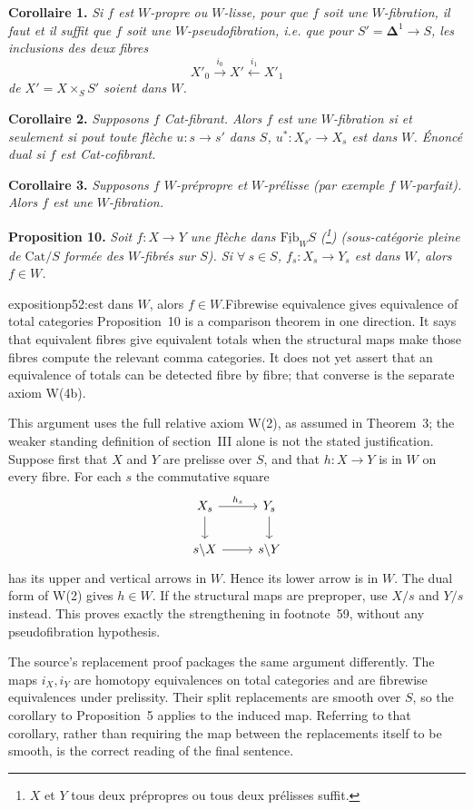 \textbf{Corollaire 1.} \textit{Si $f$ est $W$-propre ou $W$-lisse, pour que $f$ soit une $W$-fibration, il faut et il suffit que $f$ soit une $W$-pseudofibration, i.e. que pour $S' = \mathbf{\Delta}^1 \longrightarrow S$, les inclusions des deux fibres}
\[ X'_0 \xrightarrow{i_0} X' \xleftarrow{i_1} X'_1 \]
\textit{de $X' = X \times_S S'$ soient dans $W$.}

\textbf{Corollaire 2.} \textit{Supposons $f$ \textup{Cat}-fibrant. Alors $f$ est une $W$-fibration si et seulement si pout toute flèche $u : s \longrightarrow s'$ dans $S$, $u^* : X_{s'} \longrightarrow X_s$ est dans $W$. Énoncé dual si $f$ est \textup{Cat}-cofibrant.} %

\textbf{Corollaire 3.} \textit{Supposons $f$ $W$-prépropre et $W$-prélisse (par exemple $f$ $W$-parfait). Alors $f$ est une $W$-fibration.}

\textbf{Proposition 10.} \textit{Soit $f : X \longrightarrow Y$ une flèche dans $\underline{\mathrm{Fib}}_WS$ (\footnote[59]{$X$ et $Y$ tous deux prépropres ou tous deux prélisses suffit.}) (sous-catégorie pleine de $\mathrm{Cat}/S$ formée des $W$-fibrés sur $S$). Si $\forall\ s \in S$, $f_s : X_s \longrightarrow Y_s$ est dans $W$, alors $f \in W$.}

\begin{dcomment}{exposition}{p52:est dans $W$, alors $f \in W$.}{Fibrewise equivalence gives equivalence of total categories}
Proposition~10 is a comparison theorem in one direction. It says that equivalent fibres give equivalent totals when the structural maps make those fibres compute the relevant comma categories. It does not yet assert that an equivalence of totals can be detected fibre by fibre; that converse is the separate axiom W(4b).

This argument uses the full relative axiom W(2), as assumed in Theorem~3; the weaker standing definition of section~III alone is not the stated justification. Suppose first that $X$ and $Y$ are prelisse over $S$, and that $h:X\to Y$ is in $W$ on every fibre. For each $s$ the commutative square
\[
\begin{tikzcd}
 X_s\arrow[r,"h_s"]\arrow[d] &Y_s\arrow[d]\\
 s\backslash X\arrow[r] &s\backslash Y
\end{tikzcd}
\]
has its upper and vertical arrows in $W$. Hence its lower arrow is in $W$. The dual form of W(2) gives $h\in W$. If the structural maps are preproper, use $X/s$ and $Y/s$ instead. This proves exactly the strengthening in footnote~59, without any pseudofibration hypothesis.

The source's replacement proof packages the same argument differently. The maps $i_X,i_Y$ are homotopy equivalences on total categories and are fibrewise equivalences under prelissity. Their split replacements are smooth over $S$, so the corollary to Proposition~5 applies to the induced map. Referring to that corollary, rather than requiring the map between the replacements itself to be smooth, is the correct reading of the final sentence.
\end{dcomment}


